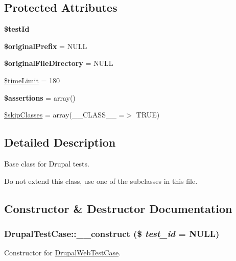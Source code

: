 \subsection*{Protected Attributes}
\begin{DoxyCompactItemize}
\item 
\hypertarget{class_drupal_test_case_a04c476de2bcf67cda4fdfc23d92b5924}{
{\bfseries \$testId}}
\label{class_drupal_test_case_a04c476de2bcf67cda4fdfc23d92b5924}

\item 
\hypertarget{class_drupal_test_case_af061ee283d91eff88b0e8f723d1a5df1}{
{\bfseries \$originalPrefix} = NULL}
\label{class_drupal_test_case_af061ee283d91eff88b0e8f723d1a5df1}

\item 
\hypertarget{class_drupal_test_case_abc9180c73bd83f311c30e85045fdfe40}{
{\bfseries \$originalFileDirectory} = NULL}
\label{class_drupal_test_case_abc9180c73bd83f311c30e85045fdfe40}

\item 
\hyperlink{class_drupal_test_case_a3718dfe6f376857a54eff711c720ed01}{\$timeLimit} = 180
\item 
\hypertarget{class_drupal_test_case_a9293d7fd953aeb2c38da939e73d40af6}{
{\bfseries \$assertions} = array()}
\label{class_drupal_test_case_a9293d7fd953aeb2c38da939e73d40af6}

\item 
\hyperlink{class_drupal_test_case_a2b29918aec212576b048e0ffa8fd5b89}{\$skipClasses} = array(\_\-\_\-CLASS\_\-\_\- =$>$ TRUE)
\end{DoxyCompactItemize}


\subsection{Detailed Description}
Base class for Drupal tests.

Do not extend this class, use one of the subclasses in this file. 

\subsection{Constructor \& Destructor Documentation}
\hypertarget{class_drupal_test_case_abb2516192da25b89bec5f5a4a7e91aab}{
\subsubsection[{\_\-\_\-construct}]{\setlength{\rightskip}{0pt plus 5cm}DrupalTestCase::\_\-\_\-construct (\$ {\em test\_\-id} = {\ttfamily NULL})}}
\label{class_drupal_test_case_abb2516192da25b89bec5f5a4a7e91aab}
Constructor for \hyperlink{class_drupal_web_test_case}{DrupalWebTestCase}.



